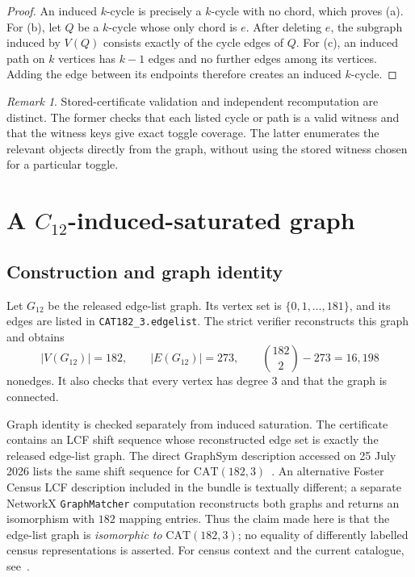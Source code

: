 \documentclass[11pt]{amsart}
\newcommand{\Ck}[1]{C_{#1}}
\newcommand{\Gtwelve}{G_{12}}
\theoremstyle{definition}
\theoremstyle{remark}
\newtheorem{remark}[remark]{Remark}
\begin{document}
\begin{proof}
An induced \(k\)-cycle is precisely a \(k\)-cycle with no chord, which proves
\textup{(a)}.  For \textup{(b)}, let \(Q\) be a \(k\)-cycle whose only chord
is \(e\).  After deleting \(e\), the subgraph induced by \(V(Q)\) consists
exactly of the cycle edges of \(Q\).  For \textup{(c)}, an induced path on
\(k\) vertices has \(k-1\) edges and no further edges among its vertices.
Adding the edge between its endpoints therefore creates an induced
\(k\)-cycle.
\end{proof}

\begin{remark}\label{rem:evidence-layers}
Stored-certificate validation and independent recomputation are distinct.
The former checks that each listed cycle or path is a valid witness and that
the witness keys give exact toggle coverage.  The latter enumerates the
relevant objects directly from the graph, without using the stored witness
chosen for a particular toggle.
\end{remark}

\section{A \texorpdfstring{\(\Ck{12}\)}{C12}-induced-saturated graph}
\label{sec:c12}

\subsection{Construction and graph identity}

Let \(\Gtwelve\) be the released edge-list graph.  Its vertex set is
\(\{0,1,\ldots,181\}\), and its edges are listed in
\texttt{CAT182\_3.edgelist}.  The strict verifier reconstructs this graph and
obtains
\[
  |V(\Gtwelve)|=182,\qquad |E(\Gtwelve)|=273,\qquad
  \binom{182}{2}-273=16{,}198
\]
nonedges.  It also checks that every vertex has degree \(3\) and that the
graph is connected.

Graph identity is checked separately from induced saturation.  The
certificate contains an LCF shift sequence whose reconstructed edge set is
exactly the released edge-list graph.  The direct GraphSym description
accessed on 25 July 2026 lists the same shift sequence for
\(\mathrm{CAT}(182,3)\)~\cite{GraphSymCAT1823}.  An alternative Foster Census
LCF description included in the bundle is textually different; a separate
NetworkX \texttt{GraphMatcher} computation reconstructs both graphs and
returns an isomorphism with \(182\) mapping entries.  Thus the claim made here
is that the edge-list graph is \emph{isomorphic to}
\(\mathrm{CAT}(182,3)\); no equality of differently labelled census
representations is asserted.  For census context and the current catalogue,
see~\cite{ConderDobcsanyi2002,ConderPotocnik2026}.
\end{document}

